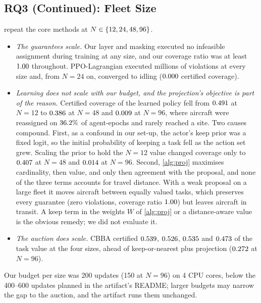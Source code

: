 \begin{table}[t]
\centering\footnotesize
\setlength{\tabcolsep}{2.5pt}
\caption{RQ3. Stronger baselines at $N=12$ (\nMLagSeeds\ training seeds $\times$ 3
evaluation seeds $\times$ 16 fleets; CBBA is deterministic, 3 $\times$ 16). Columns as in
\cref{tab:main}; eval.\ violations in \% of agent-epochs.}
\label{tab:r2}
\resizebox{\columnwidth}{!}{}
\end{table}

\subsection{RQ3 (Continued): Fleet Size}
\label{sec:rq3c}
 repeat the core methods at $N\in\{12, 24, 48, 96\}$.
\begin{itemize}[leftmargin=1.2em,itemsep=1pt,topsep=1pt]
\item \emph{The guarantees scale.} Our layer and masking executed no infeasible assignment
  during training at any size, and our coverage ratio was at least $1.00$
  throughout. PPO-Lagrangian executed millions of violations at every size and, from
  $N=24$ on, converged to idling ($0.000$ certified coverage).
\item \emph{Learning does not scale with our budget, and the projection's objective is part
  of the reason.} Certified coverage of the learned policy fell from $0.491$ at
  $N=12$ to $0.386$ at $N=48$ and $0.009$ at $N=96$, where
  aircraft were reassigned on $36.2\%$ of agent-epochs and rarely
  reached a site. Two causes compound. First, as a confound in our set-up, the actor's keep
  prior was a fixed logit, so the initial probability of keeping a task fell as the action
  set grew.
  Scaling the prior to hold the $N=12$ value changed coverage only to
  $0.407$ at $N=48$ and $0.014$ at $N=96$. Second,
  \cref{alg:proj} maximises cardinality, then value, and only then agreement with the
  proposal, and none of the three terms accounts for travel distance. With a weak proposal on
  a large fleet it moves aircraft between equally valued tasks, which preserves every
  guarantee (zero violations, coverage ratio $1.00$) but leaves aircraft in
  transit. A keep term in
  the weights $W$ of \cref{alg:proj} or a distance-aware value is the obvious
  remedy; we did not evaluate it.
\item \emph{The auction does scale.} CBBA certified $0.539$, $0.526$,
  $0.535$ and $0.473$ of the task value at the four sizes,
  ahead of keep-or-nearest plus projection ($0.272$ at $N=96$).
\end{itemize}
Our budget per size was 200 updates (150 at $N=96$) on 4 CPU cores, below the 400--600
updates planned in the artifact's README; larger budgets may narrow the gap to the auction, and the artifact runs them
unchanged.

